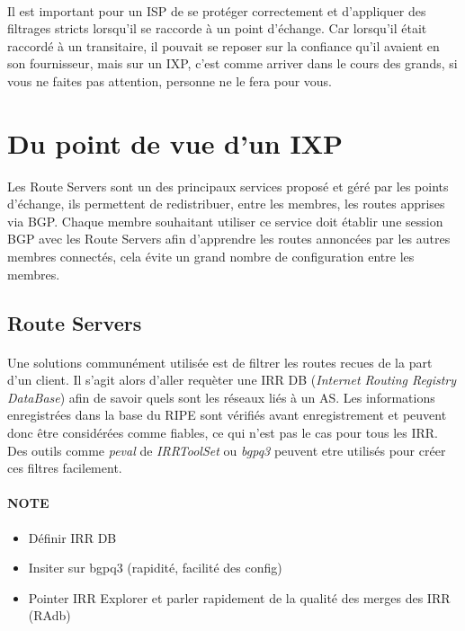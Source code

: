 \paragraph{}
Il est important pour un ISP de se protéger correctement et d'appliquer des filtrages stricts lorsqu'il se raccorde à un point d'échange.
Car lorsqu'il était raccordé à un transitaire, il pouvait se reposer sur la confiance qu'il avaient en son fournisseur, mais sur un IXP, c'est comme arriver dans le cours des grands, si vous ne faites pas attention, personne ne le fera pour vous.

\section{Du point de vue d'un IXP}

Les Route Servers sont un des principaux services proposé et géré par les points d'échange, ils permettent de redistribuer, entre les membres, les routes apprises via BGP. Chaque membre souhaitant utiliser ce service doit établir une session BGP avec les Route Servers afin d'apprendre les routes annoncées par les autres membres connectés, cela évite un grand nombre de configuration entre les membres.

\subsection{Route Servers}

\paragraph{}
Une solutions communément utilisée est de filtrer les routes recues de la part d'un client. Il s'agit alors d'aller requèter une IRR DB (\emph{Internet Routing Registry DataBase}) afin de savoir quels sont les réseaux liés à un AS. Les informations enregistrées dans la base du RIPE sont vérifiés avant enregistrement et peuvent donc être considérées comme fiables, ce qui n'est pas le cas pour tous les IRR. Des outils comme \emph{peval} de \emph{IRRToolSet}\cite{fenioux:IRRTOOLSET} ou \emph{bgpq3}\cite{fenioux:BGPQ3} peuvent etre utilisés pour créer ces filtres facilement.

\paragraph{NOTE}
\begin{itemize}
\item Définir IRR DB
\item Insiter sur bgpq3 (rapidité, facilité des config)
\item Pointer IRR Explorer et parler rapidement de la qualité des merges des IRR (RAdb)
\end{itemize}

